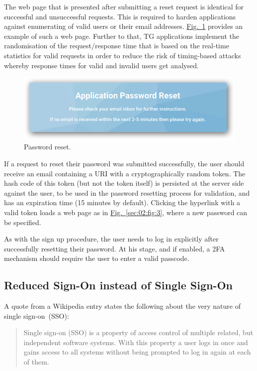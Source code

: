 \documentclass[a4paper,12pt,oneside,openright]{memoir}
\begin{document}
	The web page that is presented after submitting a reset request is identical for successful and unsuccessful requests.
	This is required to harden applications against enumerating of valid users or their email addresses.
	\hyperref[sec:02:fig:4]{Fig.~\ref*{sec:02:fig:4}} provides an example of such a web page.
	Further to that, TG applications implement the randomisation of the request/response time that is based on the real-time statistics for valid requests in order to reduce the risk of timing-based attacks whereby response times for valid and invalid users get analysed.

	\begin{figure}[h!tbp]
	\centering
	\includegraphics[width=0.7\linewidth]{images/05-password-reset.png}
	\caption{Password reset.}\label{sec:02:fig:4}
	\end{figure}

	If a request to reset their password was submitted successfully, the user should receive an email containing a URI with a cryptographically random token.
	The hash code of this token (but not the token itself) is persisted at the server side against the user, to be used in the password resetting process for validation, and has an expiration time (15 minutes by default).
	Clicking the hyperlink with a valid token loads a web page as in \hyperref[sec:02:fig:3]{Fig.~\ref*{sec:02:fig:3}}, where a new password can be specified.

	As with the sign up procedure, the user needs to log in explicitly after successfully resetting their password.
	At his stage, and if enabled, a 2FA mechanism should require the user to enter a valid passcode.

\subsection*{Reduced Sign-On instead of Single Sign-On}
	A quote from a Wikipedia entry states the following about the very nature of single sign-on~(SSO):

	\begin{quote}
	Single sign-on (SSO) is a property of access control of multiple related, but independent software systems.
	With this property a user logs in once and gains access to all systems without being prompted to log in again at each of them.
	\end{quote}
\end{document}
